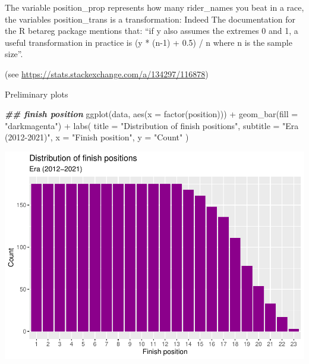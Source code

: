 \documentclass[
]{article}
\newenvironment{Shaded}{\begin{snugshade}}{\end{snugshade}}
\newcommand{\AttributeTok}[1]{\textcolor[rgb]{0.77,0.63,0.00}{#1}}
\newcommand{\DocumentationTok}[1]{\textcolor[rgb]{0.56,0.35,0.01}{\textbf{\textit{#1}}}}
\newcommand{\FunctionTok}[1]{\textcolor[rgb]{0.00,0.00,0.00}{#1}}
\newcommand{\NormalTok}[1]{#1}
\newcommand{\SpecialCharTok}[1]{\textcolor[rgb]{0.00,0.00,0.00}{#1}}
\newcommand{\StringTok}[1]{\textcolor[rgb]{0.31,0.60,0.02}{#1}}
\begin{document}
The variable position\_prop represents how many rider\_names you beat in
a race, the variables position\_trans is a transformation: Indeed The
documentation for the R betareg package mentions that: ``if y also
assumes the extremes 0 and 1, a useful transformation in practice is (y
* (n-1) + 0.5) / n where n is the sample size''.

(see \url{https://stats.stackexchange.com/a/134297/116878})

Preliminary plots

\begin{Shaded}
\begin{Highlighting}[]
\DocumentationTok{\#\# finish position}
\FunctionTok{ggplot}\NormalTok{(data, }\FunctionTok{aes}\NormalTok{(}\AttributeTok{x =} \FunctionTok{factor}\NormalTok{(position))) }\SpecialCharTok{+}
  \FunctionTok{geom\_bar}\NormalTok{(}\AttributeTok{fill =} \StringTok{"darkmagenta"}\NormalTok{) }\SpecialCharTok{+}
  \FunctionTok{labs}\NormalTok{(}
    \AttributeTok{title =} \StringTok{"Distribution of finish positions"}\NormalTok{,}
    \AttributeTok{subtitle =} \StringTok{"Era (2012{-}2021)"}\NormalTok{,}
    \AttributeTok{x =} \StringTok{"Finish position"}\NormalTok{,}
    \AttributeTok{y =} \StringTok{"Count"}
\NormalTok{  )}
\end{Highlighting}
\end{Shaded}

\includegraphics{Project_files/figure-latex/unnamed-chunk-4-1.pdf}
\end{document}
